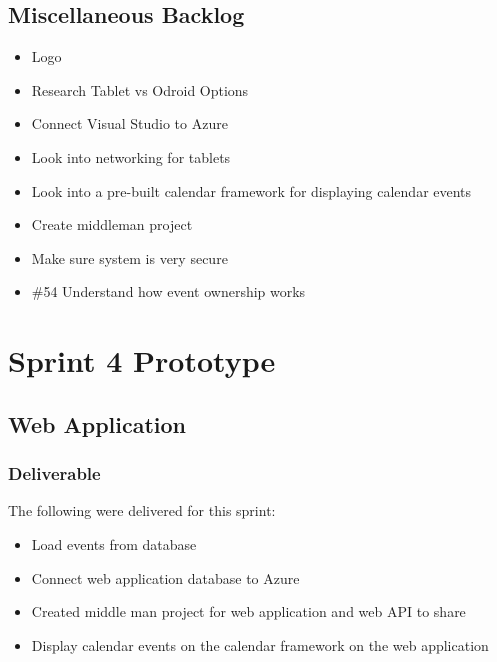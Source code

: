 \subsection*{Miscellaneous Backlog}
\begin{itemize}
\item Logo
\item Research Tablet vs Odroid Options
\item Connect Visual Studio to Azure
\item Look into networking for tablets
\item Look into a pre-built calendar framework for displaying calendar events
\item Create middleman project
\item Make sure system is very secure
\item \#54 Understand how event ownership works
\end{itemize}

\section{Sprint 4 Prototype}

\subsection{Web Application}
\subsubsection{Deliverable}
The following were delivered for this sprint:
\begin{itemize}
\item Load events from database
\item Connect web application database to Azure
\item Created middle man project for web application and web API to share
\item Display calendar events on the calendar framework on the web application
\end{itemize}

